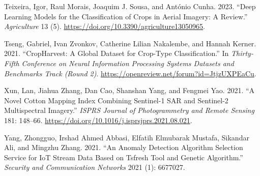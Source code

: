 \documentclass[
  journal,
  twocolumn]{IEEEtran}
\newlength{\cslhangindent}
\newlength{\cslentryspacingunit} %
\newenvironment{CSLReferences}[2] %
 {%
  \setlength{\parindent}{0pt}
  \ifodd #1
  \let\oldpar\par
  \def\par{\hangindent=\cslhangindent\oldpar}
  \fi
  \setlength{\parskip}{#2\cslentryspacingunit}
 }%
 {}
\begin{document}
\begin{CSLReferences}{1}{0}
\leavevmode{}%
Teixeira, Igor, Raul Morais, Joaquim J. Sousa, and António Cunha. 2023.
{``Deep Learning Models for the Classification of Crops in Aerial
Imagery: A Review.''} \emph{Agriculture} 13 (5).
\url{https://doi.org/10.3390/agriculture13050965}.

\leavevmode{}%
Tseng, Gabriel, Ivan Zvonkov, Catherine Lilian Nakalembe, and Hannah
Kerner. 2021. {``CropHarvest: A Global Dataset for Crop-Type
Classification.''} In \emph{Thirty-Fifth Conference on Neural
Information Processing Systems Datasets and Benchmarks Track (Round 2)}.
\url{https://openreview.net/forum?id=JtjzUXPEaCu}.

\leavevmode{}%
Xun, Lan, Jiahua Zhang, Dan Cao, Shanshan Yang, and Fengmei Yao. 2021.
{``A Novel Cotton Mapping Index Combining Sentinel-1 SAR and Sentinel-2
Multispectral Imagery.''} \emph{ISPRS Journal of Photogrammetry and
Remote Sensing} 181: 148--66.
\url{https://doi.org/10.1016/j.isprsjprs.2021.08.021}.

\leavevmode{}%
Yang, Zhongguo, Irshad Ahmed Abbasi, Elfatih Elmubarak Mustafa, Sikandar
Ali, and Mingzhu Zhang. 2021. {``An Anomaly Detection Algorithm
Selection Service for IoT Stream Data Based on Tsfresh Tool and Genetic
Algorithm.''} \emph{Security and Communication Networks} 2021 (1):
6677027.

\end{CSLReferences}
\end{document}
